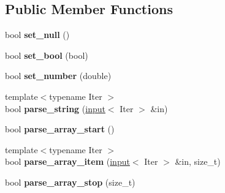 \subsection*{Public Member Functions}
\begin{DoxyCompactItemize}
\item 
\hypertarget{classpicojson_1_1null__parse__context_ad142ddadd513e41324f8d0515a19df2c}{bool {\bfseries set\-\_\-null} ()}\label{classpicojson_1_1null__parse__context_ad142ddadd513e41324f8d0515a19df2c}

\item 
\hypertarget{classpicojson_1_1null__parse__context_aa77397f08cf7859fabc04e9e4460b93a}{bool {\bfseries set\-\_\-bool} (bool)}\label{classpicojson_1_1null__parse__context_aa77397f08cf7859fabc04e9e4460b93a}

\item 
\hypertarget{classpicojson_1_1null__parse__context_aeb8326108d42615b1b04cf82d510040c}{bool {\bfseries set\-\_\-number} (double)}\label{classpicojson_1_1null__parse__context_aeb8326108d42615b1b04cf82d510040c}

\item 
\hypertarget{classpicojson_1_1null__parse__context_aab2c7dee1eb5b477370832811cd40d14}{{\footnotesize template$<$typename Iter $>$ }\\bool {\bfseries parse\-\_\-string} (\hyperlink{classpicojson_1_1input}{input}$<$ Iter $>$ \&in)}\label{classpicojson_1_1null__parse__context_aab2c7dee1eb5b477370832811cd40d14}

\item 
\hypertarget{classpicojson_1_1null__parse__context_ae78f8991e157a85b7ce0fb36f9a5f628}{bool {\bfseries parse\-\_\-array\-\_\-start} ()}\label{classpicojson_1_1null__parse__context_ae78f8991e157a85b7ce0fb36f9a5f628}

\item 
\hypertarget{classpicojson_1_1null__parse__context_a6623f92117dd6dc7bca60e9e9463a1a0}{{\footnotesize template$<$typename Iter $>$ }\\bool {\bfseries parse\-\_\-array\-\_\-item} (\hyperlink{classpicojson_1_1input}{input}$<$ Iter $>$ \&in, size\-\_\-t)}\label{classpicojson_1_1null__parse__context_a6623f92117dd6dc7bca60e9e9463a1a0}

\item 
\hypertarget{classpicojson_1_1null__parse__context_a8a763b600c17c5db42aee9afb2d2551d}{bool {\bfseries parse\-\_\-array\-\_\-stop} (size\-\_\-t)}\label{classpicojson_1_1null__parse__context_a8a763b600c17c5db42aee9afb2d2551d}


\end{DoxyCompactItemize}
